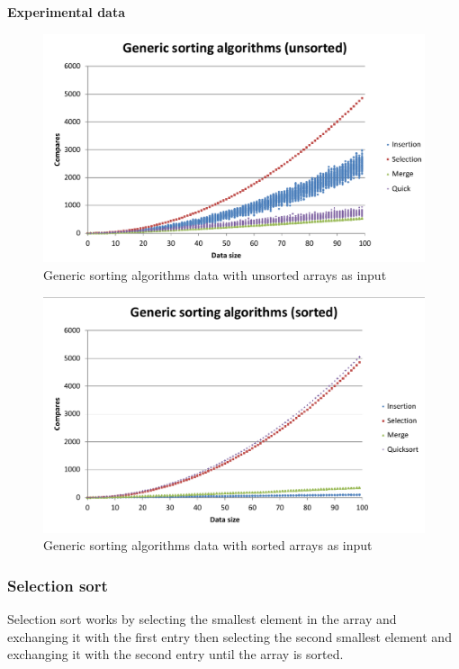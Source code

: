 \documentclass[pdftex,11pt,a4paper,english,titlepage]{article}
\begin{document}
\newpage
\textbf{Experimental data}\\
\begin{figure}[H]
	\centering
	\includegraphics[scale=0.85]{unsortedChart.pdf} 
	\caption{Generic sorting algorithms data with unsorted arrays as input}
	\label{fig:unsChart}
\end{figure}

\begin{figure}[H]
	\centering
	\includegraphics[scale=0.85]{sortedChart.pdf} 
	\caption{Generic sorting algorithms data with sorted arrays as input}
	\label{fig:sChart}
\end{figure}

    
		\subsubsection{Selection sort}
Selection sort works by selecting the smallest element in the array and exchanging it with the first entry then selecting the second smallest element and exchanging it with the second entry until the array is sorted.
\end{document}
